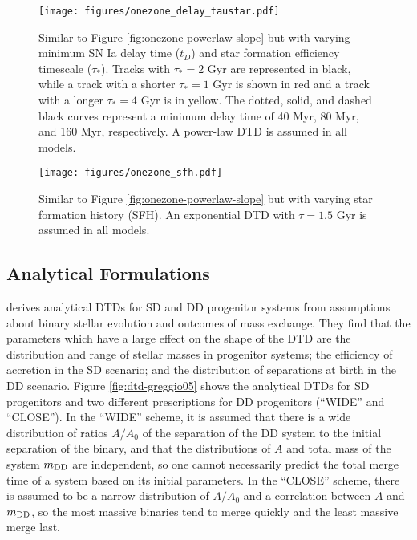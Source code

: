 \documentclass[twocolumn,linenumbers,twocolappendix]{aastex631}
\begin{document}
\begin{figure}
    \centering
    \texttt{[image: figures/onezone\_delay\_taustar.pdf]}
    \caption{Similar to Figure \ref{fig:onezone-powerlaw-slope} but with varying minimum SN Ia delay time ($t_D$) and star formation efficiency timescale ($\tau_*$). Tracks with $\tau_*=2$ Gyr are represented in black, while a track with a shorter $\tau_*=1$ Gyr is shown in red and a track with a longer $\tau_*=4$ Gyr is in yellow. The dotted, solid, and dashed black curves represent a minimum delay time of 40 Myr, 80 Myr, and 160 Myr, respectively. A power-law DTD is assumed in all models.}
    \label{fig:onezone-delay-taustar}
\end{figure}

\begin{figure}
    \centering
    \texttt{[image: figures/onezone\_sfh.pdf]}
    \caption{Similar to Figure \ref{fig:onezone-powerlaw-slope} but with varying star formation history (SFH). An exponential DTD with $\tau=1.5$ Gyr is assumed in all models.}
    \label{fig:onezone-sfh}
\end{figure}

\subsection{Analytical Formulations}

\citet{Greggio2005-AnalyticalRates} derives analytical DTDs for SD and DD progenitor systems from assumptions about binary stellar evolution and outcomes of mass exchange. They find that the parameters which have a large effect on the shape of the DTD are the distribution and range of stellar masses in progenitor systems; the efficiency of accretion in the SD scenario; and the distribution of separations at birth in the DD scenario. Figure \ref{fig:dtd-greggio05} shows the analytical DTDs for SD progenitors and two different prescriptions for DD progenitors (``WIDE'' and ``CLOSE''). In the ``WIDE'' scheme, it is assumed that there is a wide distribution of ratios $A/A_0$ of the separation of the DD system to the initial separation of the binary, and that the distributions of $A$ and total mass of the system $m_{\rm DD}$ are independent, so one cannot necessarily predict the total merge time of a system based on its initial parameters. In the ``CLOSE'' scheme, there is assumed to be a narrow distribution of $A/A_0$ and a correlation between $A$ and $m_{\rm DD}$, so the most massive binaries tend to merge quickly and the least massive merge last.
\end{document}
